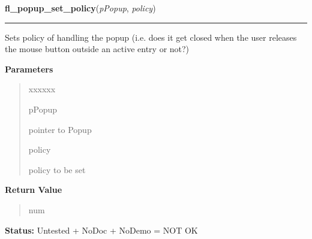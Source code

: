 \hspace{.8\funcindent}\begin{boxedminipage}{\funcwidth}

    \raggedright \textbf{fl\_popup\_set\_policy}(\textit{pPopup}, \textit{policy})

    \vspace{-1.5ex}

    \rule{\textwidth}{0.5\fboxrule}
\setlength{\parskip}{2ex}
    Sets policy of handling the popup (i.e. does it get closed when the 
    user releases the mouse button outside an active entry or not?)

\setlength{\parskip}{1ex}
      \textbf{Parameters}
      \vspace{-1ex}

      \begin{quote}
        \begin{Ventry}{xxxxxx}

          \item[pPopup]

          pointer to Popup

          \item[policy]

          policy to be set

        \end{Ventry}

      \end{quote}

      \textbf{Return Value}
    \vspace{-1ex}

      \begin{quote}
      num

      \end{quote}

\textbf{Status:} Untested + NoDoc + NoDemo = NOT OK



    \end{boxedminipage}

    \label{xformslib:flpopup:fl_popup_set_callback}

    \vspace{0.5ex}

